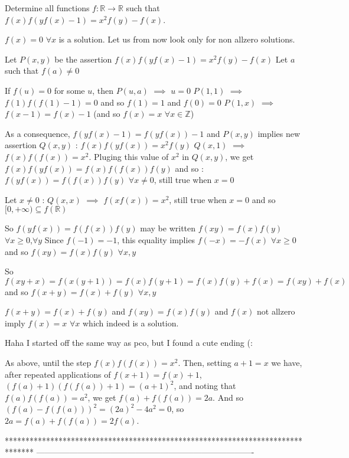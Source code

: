 \begin{solution}
	\begin{tcolorbox}Determine all functions $f: \mathbb{R}\to\mathbb{R}$ such that $f(x)f(yf(x)-1)=x^2f(y)-f(x)$.\end{tcolorbox}
$\boxed{f(x)=0}$ $\forall x$ is a solution.
Let us from now look only for non allzero solutions.

Let  $P(x,y)$ be the assertion $f(x)f(yf(x)-1)=x^2f(y)-f(x)$
Let $a$ such that $f(a)\ne 0$

If $f(u)=0$ for some $u$, then $P(u,a)$ $\implies$ $u=0$
$P(1,1)$ $\implies$ $f(1)f(f(1)-1)=0$ and so $f(1)=1$ and $f(0)=0$
$P(1,x)$ $\implies$ $f(x-1)=f(x)-1$ (and so $f(x)=x$ $\forall x\in\mathbb Z$)

As a consequence, $f(yf(x)-1)=f(yf(x))-1$ and $P(x,y)$ implies new assertion $Q(x,y)$ : $f(x)f(yf(x))=x^2f(y)$
$Q(x,1)$ $\implies$ $f(x)f(f(x))=x^2$.
Pluging this value of $x^2$ in $Q(x,y)$, we get $f(x)f(yf(x))=f(x)f(f(x))f(y)$ and so :
$f(yf(x))=f(f(x))f(y)$ $\forall x\ne 0$, still true when $x=0$

Let $x\ne 0$ : $Q(x,x)$ $\implies$ $f(xf(x))=x^2$, still true when $x=0$ and so $[0,+\infty)\subseteq f(\mathbb R)$

So $f(yf(x))=f(f(x))f(y)$ may be written $f(xy)=f(x)f(y)$ $\forall x\ge 0$,$\forall y$
Since $f(-1)=-1$, this equality implies $f(-x)=-f(x)$ $\forall x\ge 0$ and so $f(xy)=f(x)f(y)$ $\forall x,y$

So $f(xy+x)=f(x(y+1))=f(x)f(y+1)=f(x)f(y)+f(x)=f(xy)+f(x)$ and so $f(x+y)=f(x)+f(y)$ $\forall x,y$

$f(x+y)=f(x)+f(y)$ and $f(xy)=f(x)f(y)$ and $f(x)$ not allzero imply $\boxed{f(x)=x}$ $\forall x$ which indeed is a solution.
\end{solution}



\begin{solution}
	Haha I started off the same way as pco, but I found a cute ending (:

As above, until the step $f(x)f(f(x))=x^2$.
Then, setting $a+1=x$ we have, after repeated applications of $f(x+1)=f(x)+1$,
$(f(a)+1)(f(f(a))+1) = (a+1)^2$, and noting that $f(a)f(f(a))=a^2$, we get $f(a)+f(f(a))=2a$.
And so $(f(a)-f(f(a)))^2 = (2a)^2 - 4a^2 = 0$, so $2a=f(a)+f(f(a))=2f(a)$.
\end{solution}
*******************************************************************************
-------------------------------------------------------------------------------

